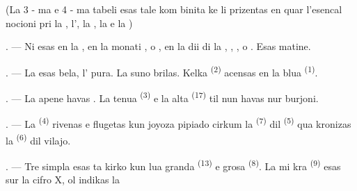 \begin{VUpage}[19]{}
\VUsaut{3.0mm}
\VUsaut{1.6mm}
\VUsaut{3.4mm}

\VUblancAlinea
(La 3 - ma e 4 - ma tabeli esas tale kom\cc
binita ke li prizentas en quar \nl
l'esencal nocioni pri la , l', la \cc
{}, la  e la )

\VUsaut{4.0mm}
\VUsaut{3.0mm}

\VUsaut{2.4mm}

\VUsaut{3.0mm}

. --- Ni esas en la , en la monati\nl
{},  o , en la dii di la ,\nl
{}, , o . Esas \nl
matine.

. --- La  esas bela, l' pura. La\nl
suno brilas. Kelka  \textsuperscript{(2)} acensas en la\nl
blua  \textsuperscript{(1)}.

. --- La  apene havas . La tenua\nl
{} \textsuperscript{(3)} e la alta  \textsuperscript{(17)} til nun havas nur\nl
burjoni.

. --- La  \textsuperscript{(4)} rivenas e flugetas kun\nl
joyoza pipiado cirkum la  \textsuperscript{(7)} dil \cc
{} \textsuperscript{(5)} qua kronizas la  \textsuperscript{(6)} dil vilajo.

\VUsaut{3.4mm}
\VUsaut{3.0mm}

. --- Tre simpla esas ta kirko kun lua\nl
granda  \textsuperscript{(13)} e grosa  \textsuperscript{(8)}. La mi\cc
kra  \textsuperscript{(9)} esas sur la cifro X, ol indikas la
\parplein
\end{VUpage}

